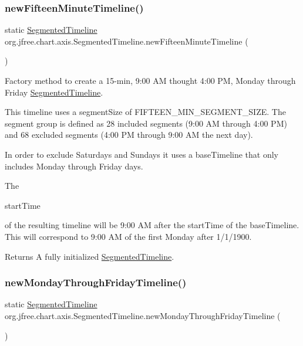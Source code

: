 \subsubsection{\texorpdfstring{new\+Fifteen\+Minute\+Timeline()}{newFifteenMinuteTimeline()}}
{\footnotesize\ttfamily static \mbox{\hyperlink{classorg_1_1jfree_1_1chart_1_1axis_1_1_segmented_timeline}{Segmented\+Timeline}} org.\+jfree.\+chart.\+axis.\+Segmented\+Timeline.\+new\+Fifteen\+Minute\+Timeline (\begin{DoxyParamCaption}{ }\end{DoxyParamCaption})\hspace{0.3cm}{\ttfamily [static]}}

Factory method to create a 15-\/min, 9\+:00 AM thought 4\+:00 PM, Monday through Friday \mbox{\hyperlink{classorg_1_1jfree_1_1chart_1_1axis_1_1_segmented_timeline}{Segmented\+Timeline}}. 

This timeline uses a segment\+Size of F\+I\+F\+T\+E\+E\+N\+\_\+\+M\+I\+N\+\_\+\+S\+E\+G\+M\+E\+N\+T\+\_\+\+S\+I\+ZE. The segment group is defined as 28 included segments (9\+:00 AM through 4\+:00 PM) and 68 excluded segments (4\+:00 PM through 9\+:00 AM the next day). 

In order to exclude Saturdays and Sundays it uses a base\+Timeline that only includes Monday through Friday days. 

The
\begin{DoxyCode}
startTime 
\end{DoxyCode}
 of the resulting timeline will be 9\+:00 AM after the start\+Time of the base\+Timeline. This will correspond to 9\+:00 AM of the first Monday after 1/1/1900.

\begin{DoxyReturn}{Returns}
A fully initialized \mbox{\hyperlink{classorg_1_1jfree_1_1chart_1_1axis_1_1_segmented_timeline}{Segmented\+Timeline}}. 
\end{DoxyReturn}
\mbox{\label{classorg_1_1jfree_1_1chart_1_1axis_1_1_segmented_timeline_a298842f4c7afa5dc9d3737304ce9ebc2}} 
\subsubsection{\texorpdfstring{new\+Monday\+Through\+Friday\+Timeline()}{newMondayThroughFridayTimeline()}}
{\footnotesize\ttfamily static \mbox{\hyperlink{classorg_1_1jfree_1_1chart_1_1axis_1_1_segmented_timeline}{Segmented\+Timeline}} org.\+jfree.\+chart.\+axis.\+Segmented\+Timeline.\+new\+Monday\+Through\+Friday\+Timeline (\begin{DoxyParamCaption}{ }\end{DoxyParamCaption})\hspace{0.3cm}{\ttfamily [static]}}

